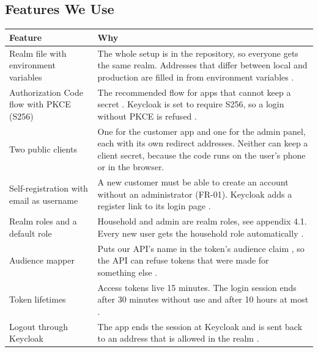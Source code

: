 \documentclass[a4paper,11pt]{article}
\begin{document}
\subsection{Features We Use}
\begin{center}
\begin{tabular}{@{}p{4cm} p{10.4cm}@{}}
\textbf{Feature} & \textbf{Why} \\
\hline
Realm file with environment variables & The whole setup is in the repository, so everyone gets the same realm. Addresses that differ between local and production are filled in from environment variables \cite[sec.~Using Environment Variables within the Realm Configuration Files]{keycloak-import-export}. \\
\hline
Authorization Code flow with PKCE (S256) & The recommended flow for apps that cannot keep a secret \cite[sec.~2.1.1]{ietf-rfc9700-oauth-security-bcp}. Keycloak is set to require S256, so a login without PKCE is refused \cite[sec.~Capability Config]{keycloak-server-admin-guide}. \\
\hline
Two public clients & One for the customer app and one for the admin panel, each with its own redirect addresses. Neither can keep a client secret, because the code runs on the user's phone or in the browser. \\
\hline
Self-registration with email as username & A new customer must be able to create an account without an administrator (FR-01). Keycloak adds a register link to its login page \cite[sec.~Allowing users to self-register]{keycloak-server-admin-guide}. \\
\hline
Realm roles and a default role & Household and admin are realm roles, see appendix 4.1. Every new user gets the household role automatically \cite[sec.~Using default roles]{keycloak-server-admin-guide}. \\
\hline
Audience mapper & Puts our API's name in the token's audience claim \cite[sec.~Hardcoded audience]{keycloak-server-admin-guide}, so the API can refuse tokens that were made for something else \cite[sec.~2.3]{ietf-rfc9700-oauth-security-bcp}. \\
\hline
Token lifetimes & Access tokens live 15 minutes. The login session ends after 30 minutes without use and after 10 hours at most \cite[sec.~Session and token timeouts]{keycloak-server-admin-guide}. \\
\hline
Logout through Keycloak & The app ends the session at Keycloak and is sent back to an address that is allowed in the realm \cite[sec.~RP-Initiated Logout]{keycloak-server-admin-guide}. \\
\hline
\end{tabular}
\end{center}
\end{document}
